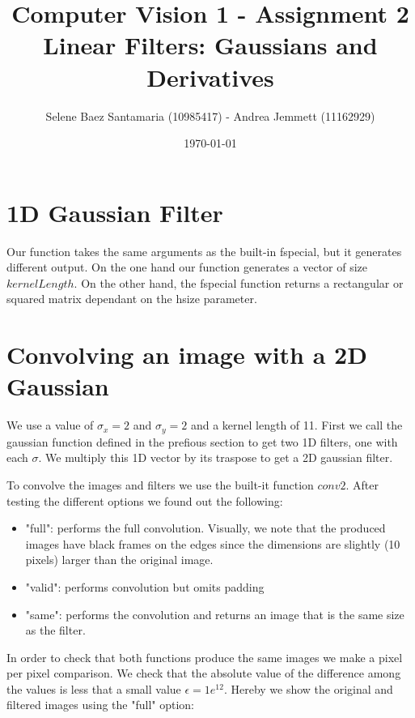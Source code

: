 \documentclass[11pt]{article}
\title{
	{Computer Vision 1 - Assignment 2 \\
	Linear Filters: Gaussians and Derivatives}
}
\author{
Selene Baez Santamaria (10985417) - Andrea Jemmett (11162929)}
\date{\today}
\begin{document}
\maketitle


\section{1D Gaussian Filter}
Our function takes the same arguments as the built-in fspecial, but it generates different output. On the one hand our function generates a vector of size $kernelLength$. On the other hand, the fspecial function returns a rectangular or squared matrix dependant on the hsize parameter. 


\section{Convolving an image with a 2D Gaussian}
We use a value of $\sigma_x = 2$ and $\sigma_y = 2$ and a kernel length of 11. First we call the gaussian function defined in the prefious section to get two 1D filters, one with each $\sigma$. We multiply this 1D vector by its traspose to get a 2D gaussian filter. 

To convolve the images and filters we use the built-it function $conv2$. After testing the different options we found out the following:

\begin{itemize}
	\item "full": performs the full convolution. Visually, we note that the produced images have black frames on the edges since the dimensions are slightly (10 pixels) larger than the original image.
	\item "valid": performs convolution but omits padding %
	\item "same": performs the convolution and returns an image that is the same size as the filter. 
\end{itemize}

In order to check that both functions produce the same images we make a pixel per pixel comparison. We check that the absolute value of the difference among the values is less that a small value $\epsilon = 1 e^12$. Hereby we show the original and filtered images using the "full" option:
\end{document}
